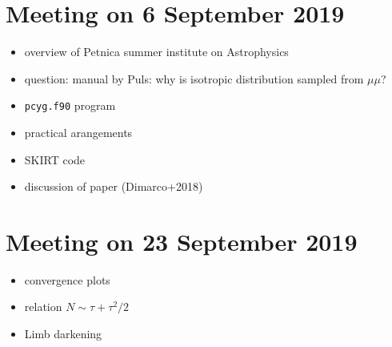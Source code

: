 \documentclass[../main/main.tex]{subfiles}
\begin{document}
\section{Meeting on 6 September 2019}
\begin{itemize}
\item overview of Petnica summer institute on Astrophysics

\item question: manual by Puls: why is isotropic distribution sampled from $\mu \mu$?

\item \texttt{pcyg.f90} program

\item practical arangements  

\item SKIRT code 
\item discussion of paper (Dimarco+2018)
\end{itemize}

\section{Meeting on 23 September 2019}
\begin{itemize}
\item convergence plots
\item relation $N \sim \tau + \tau^2/2$
\item Limb darkening
\end{itemize}
\end{document}
